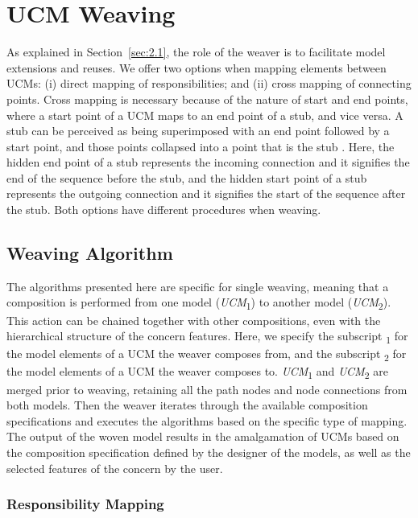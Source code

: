 
\section{UCM Weaving} \label{sec:3.2}

As explained in Section~\ref{sec:2.1}, the role of the weaver is to facilitate model extensions and reuses. We offer two options when mapping elements between UCMs: (i) direct mapping of responsibilities; and (ii) cross mapping of connecting points. Cross mapping is necessary because of the nature of start and end points, where a start point of a UCM maps to an end point of a stub, and vice versa. A stub can be perceived as being superimposed with an end point followed by a start point, and those points collapsed into a point that is the stub \cite{buhr1995use}. Here, the hidden end point of a stub represents the incoming connection and it signifies the end of the sequence before the stub, and the hidden start point of a stub represents the outgoing connection and it signifies the start of the sequence after the stub. Both options have different procedures when weaving.

\subsection{Weaving Algorithm}

The algorithms presented here are specific for single weaving, meaning that a composition is performed from one model (\emph{UCM}\textsubscript{1}) to another model (\emph{UCM}\textsubscript{2}). This action can be chained together with other compositions, even with the hierarchical structure of the concern features. Here, we specify the subscript \textsubscript{1} for the model elements of a UCM the weaver composes from, and the subscript \textsubscript{2} for the model elements of a UCM the weaver composes to. \emph{UCM}\textsubscript{1} and \emph{UCM}\textsubscript{2} are merged prior to weaving, retaining all the path nodes and node connections from both models. Then the weaver iterates through the available composition specifications and executes the algorithms based on the specific type of mapping. The output of the woven model results in the amalgamation of UCMs based on the composition specification defined by the designer of the models, as well as the selected features of the concern by the user.

\subsubsection{Responsibility Mapping} \label{sec:3.2.1.1}

